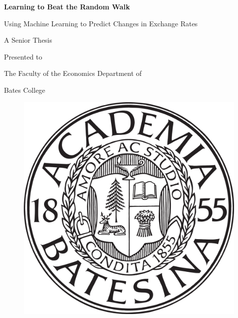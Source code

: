 \documentclass[12pt, a4paper]{report}
\begin{document}


\vspace*{0.1cm}

\centerline{\Large \textbf{Learning to Beat the Random Walk}}

\vspace*{12mm}

\centerline{\Large Using Machine Learning to Predict Changes in Exchange Rates}
\vspace*{12mm}
\centerline{\Large  A Senior Thesis}
\vspace*{5mm}
\centerline{\Large Presented to}
\vspace*{5mm}
\centerline{\Large The Faculty of the Economics Department of}
\vspace*{5mm}
\centerline{\Large Bates College}
\vspace*{5mm}

\begin{figure}[H]
    \centering
    \includegraphics[scale=.15]{images/bates_logo.png}
\end{figure}

\vspace*{5mm}
\end{document}
